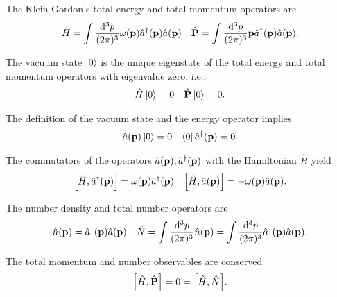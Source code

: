 \begin{definition}\label{def:qkg_energy_momentum}
	The Klein-Gordon's total energy and total momentum operators are
	\begin{align}
		\hat{H}
		=
		\int\frac{\dd[3]{p}}{(2\pi)^3}
		\omega(\vb{p})\hat{a}^\dagger(\vb{p})\hat{a}(\vb{p})
		&&
		\hat{\vb{P}}
		=
		\int\frac{\dd[3]{p}}{(2\pi)^3}
		\vb{p}\hat{a}^\dagger(\vb{p})\hat{a}(\vb{p})
		\label{eq:qkg_energy_momentum}
		.
	\end{align}
\end{definition}
\begin{definition}\label{def:vacuum_state}
	The vacuum state $\ket{0}$ is the unique eigenstate of the total energy and total momentum operators with eigenvalue zero, i.e.,
	\begin{align}
		\hat{H}
		\ket{0}
		=
		0
		&&
		\hat{\vb{P}}
		\ket{0}
		=
		0
		.
	\end{align}
\end{definition}
\begin{corollary}\label{thm:vacuum_state_ac}
	The definition of the vacuum state and the energy operator implies
	\begin{align}
		\hat{a}(\vb{p})
		\ket{0}
		=
		0
		&&
		\bra{0}
		\hat{a}^\dagger(\vb{p})
		=
		0
		.
	\end{align}
\end{corollary}
\begin{corollary}
	The commutators of the operators $\hat{a}(\vb{p}),\hat{a}^\dagger(\vb{p})$ with the Hamiltonian $\hat{H}$ yield
	\begin{align}
		\comm{\hat{H}}{\hat{a}^\dagger(\vb{p})}
		=
		\omega(\vb{p})
		\hat{a}^\dagger(\vb{p})
		&&
		\comm{\hat{H}}{\hat{a}(\vb{p})}
		=
		-
		\omega(\vb{p})
		\hat{a}(\vb{p})
		.
	\end{align}
\end{corollary}
\begin{definition}
	The number density and total number operators are
	\begin{align}
		\hat{n}(\vb{p})
		=
		\hat{a}^\dagger(\vb{p})
		\hat{a}(\vb{p})
		&&
		\hat{N}
		=
		\int\frac{\dd[3]{p}}{(2\pi)^3}
		\hat{n}(\vb{p})
		=
		\int\frac{\dd[3]{p}}{(2\pi)^3}
		\hat{a}^\dagger(\vb{p})
		\hat{a}(\vb{p})
		.
	\end{align}
\end{definition}
\begin{corollary}
	The total momentum and number observables are conserved
	\begin{equation}
		\comm{\hat{H}}{\hat{\vb{P}}}
		=
		0
		=
		\comm{\hat{H}}{\hat{N}}
		.
	\end{equation}
\end{corollary}


